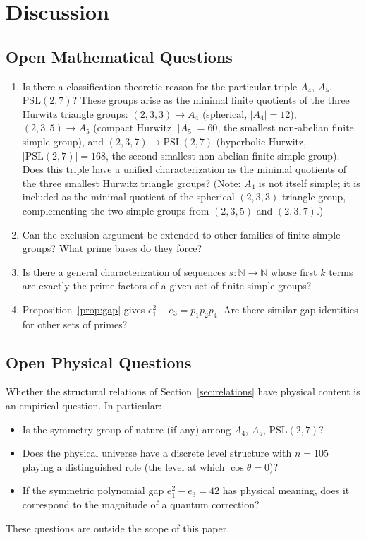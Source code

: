 ﻿\documentclass[11pt]{article}
\begin{document}
\section{Discussion}
\label{sec:discussion}

\subsection{Open Mathematical Questions}
\begin{enumerate}
\item Is there a classification-theoretic reason for the
  particular triple $A_4$, $A_5$, $\mathrm{PSL}(2,7)$?
  These groups arise as the minimal finite quotients of the
  three Hurwitz triangle groups:
  $(2,3,3) \to A_4$ (spherical, $|A_4| = 12$),
  $(2,3,5) \to A_5$ (compact Hurwitz, $|A_5| = 60$,
  the smallest non-abelian finite simple group), and
  $(2,3,7) \to \mathrm{PSL}(2,7)$ (hyperbolic Hurwitz,
  $|\mathrm{PSL}(2,7)| = 168$, the second smallest
  non-abelian finite simple group). Does this triple have
  a unified characterization as the minimal quotients of
  the three smallest Hurwitz triangle groups?
  (Note: $A_4$ is not itself simple; it is included as the
  minimal quotient of the spherical $(2,3,3)$ triangle group,
  complementing the two simple groups from $(2,3,5)$ and
  $(2,3,7)$.)
\item Can the exclusion argument be extended to other
  families of finite simple groups? What prime bases do
  they force?
\item Is there a general characterization of sequences
  $s : \mathbb{N} \to \mathbb{N}$ whose first $k$ terms
  are exactly the prime factors of a given set of finite
  simple groups?
\item Proposition~\ref{prop:gap} gives
  $e_1^2 - e_3 = p_1 p_2 p_4$. Are there similar gap
  identities for other sets of primes?
\end{enumerate}

\subsection{Open Physical Questions}
Whether the structural relations of
Section~\ref{sec:relations} have physical content is an
empirical question. In particular:
\begin{itemize}
\item Is the symmetry group of nature (if any) among
  $A_4$, $A_5$, $\mathrm{PSL}(2,7)$?
\item Does the physical universe have a discrete level
  structure with $n = 105$ playing a distinguished role
  (the level at which $\cos\theta = 0$)?
\item If the symmetric polynomial gap
  $e_1^2 - e_3 = 42$ has physical meaning, does it
  correspond to the magnitude of a quantum correction?
\end{itemize}
These questions are outside the scope of this paper.
\end{document}
